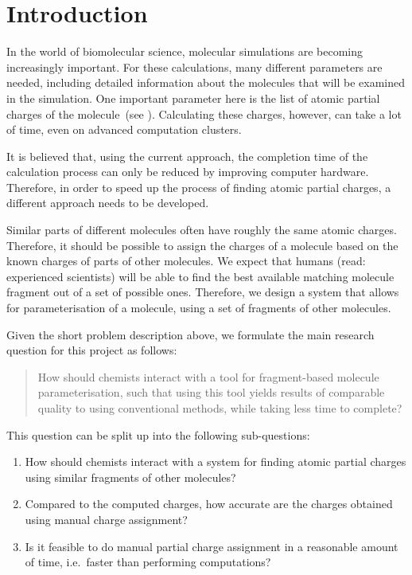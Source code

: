 \chapter{Introduction}

In the world of biomolecular science, molecular simulations are becoming increasingly important. For these calculations, many different parameters are needed, including detailed information about the molecules that will be examined in the simulation. One important parameter here is the list of atomic partial charges of the molecule~(see ). Calculating these charges, however, can take a lot of time, even on advanced computation clusters.

It is believed that, using the current approach, the completion time of the calculation process can only be reduced by improving computer hardware. Therefore, in order to speed up the process of finding atomic partial charges, a different approach needs to be developed.

Similar parts of different molecules often have roughly the same atomic charges. Therefore, it should be possible to assign the charges of a molecule based on the known charges of parts of other molecules. We expect that humans (read: experienced scientists) will be able to find the best available matching molecule fragment out of a set of possible ones. Therefore, we design a system that allows for parameterisation of a molecule, using a set of fragments of other molecules.

Given the short problem description above, we formulate the main research question for this project as follows:
\begin{quote}
How should chemists interact with a tool for fragment-based molecule parameterisation, such that using this tool yields results of comparable quality to using conventional methods, while taking less time to complete?
\end{quote}

This question can be split up into the following sub-questions:
\begin{enumerate}
\item How should chemists interact with a system for finding atomic partial charges using similar fragments of other molecules?
\item Compared to the computed charges, how accurate are the charges obtained using manual charge assignment?
\item Is it feasible to do manual partial charge assignment in a reasonable amount of time, i.e.\ faster than performing computations?
\end{enumerate}

